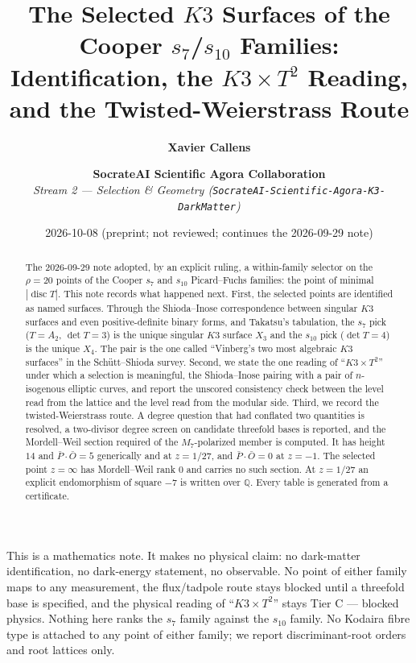 \documentclass[11pt,a4paper]{article}
\title{\Large \textbf{The Selected $K3$ Surfaces of the Cooper $s_7$/$s_{10}$ Families:}\\[0.2em]
\textbf{Identification, the $K3\times T^2$ Reading, and the Twisted-Weierstrass Route}}
\author{\textbf{Xavier Callens} \and \textbf{SocrateAI Scientific Agora Collaboration} \\[0.3em]
\textit{Stream 2 --- Selection \& Geometry (\texttt{SocrateAI-Scientific-Agora-K3-DarkMatter})}}
\date{2026-10-08 \quad (preprint; not reviewed; continues the 2026-09-29 note)}
\theoremstyle{remark}
\newcommand{\tierC}{\colorbox{orange!15}{\textsf{\scriptsize Tier C --- blocked physics}}}
\begin{document}
\maketitle

\begin{scopebox}
This is a mathematics note. It makes no physical claim: no dark-matter identification, no dark-energy
statement, no observable. No point of either family maps to any measurement, the flux/tadpole route stays
blocked until a threefold base is specified, and the physical reading of ``$K3\times T^2$'' stays \tierC.
Nothing here ranks the $s_7$ family against the $s_{10}$ family. No Kodaira fibre type is attached to any
point of either family; we report discriminant-root orders and root lattices only.
\end{scopebox}

\begin{abstract}
The 2026-09-29 note adopted, by an explicit ruling, a within-family selector on the $\rho=20$ points of
the Cooper $s_7$ and $s_{10}$ Picard--Fuchs families: the point of minimal $|\operatorname{disc}T|$. This
note records what happened next. First, the selected points are identified as named surfaces. Through the
Shioda--Inose correspondence between singular $K3$ surfaces and even positive-definite binary forms, and
Takatsu's tabulation, the $s_7$ pick ($T=A_2$, $\det T=3$) is the unique singular $K3$ surface $X_3$ and the
$s_{10}$ pick ($\det T=4$) is the unique $X_4$. The pair is the one called ``Vinberg's two most algebraic $K3$
surfaces'' in the Sch\"utt--Shioda survey. Second, we state the one reading of ``$K3\times T^2$'' under which
a selection is meaningful, the Shioda--Inose pairing with a pair of $n$-isogenous elliptic curves, and
report the unscored consistency check between the level read from the lattice and the level read from the
modular side. Third, we record the twisted-Weierstrass route. A degree question that had conflated two
quantities is resolved, a two-divisor degree screen on candidate threefold bases is reported, and the
Mordell--Weil section required of the $M_7$-polarized member is computed. It has height $14$ and
$\bar P\cdot\bar O=5$ generically and at $z=1/27$, and $\bar P\cdot\bar O=0$ at $z=-1$. The selected point
$z=\infty$ has Mordell--Weil rank $0$ and carries no such section. At $z=1/27$ an explicit endomorphism of
square $-7$ is written over $\mathbb{Q}$. Every table is generated from a certificate.
\end{abstract}

\tableofcontents
\end{document}
